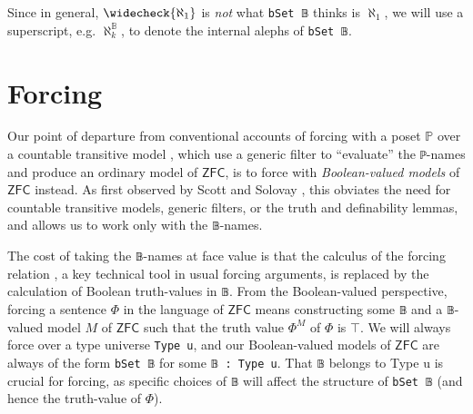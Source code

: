 \documentclass[sigplan,10pt,review, autoref,anonymous]{acmart}
\newcommand{\lil}{\lstinline}
\newcommand{\ZFC}{\mathsf{ZFC}}
\theoremstyle{definition}
\begin{document}
Since in general, \(\widecheck{\aleph_1}\) is \emph{not} what \lil{bSet 𝔹} thinks is \(\aleph_1\), we will use a superscript, e.g. \(\aleph_k^{\mathbb{B}}\), to denote the internal alephs of \lil{bSet 𝔹}.




\section{Forcing} \label{section:forcing}
Our point of departure from conventional accounts of forcing with a poset \(\mathbb{P}\) over a countable transitive model \cite{kunen2014set, jech2013set}, which use a generic filter to ``evaluate'' the \lstinline{ℙ}-names and produce an ordinary model of \(\ZFC\), is to force with \emph{Boolean-valued models} of \(\ZFC\) instead. As first observed by Scott and Solovay \cite{scott-solovay}, this obviates the need for countable transitive models, generic filters, or the truth and definability lemmas, and allows us to work only with the \lstinline{𝔹}-names.

The cost of taking the \lstinline{𝔹}-names at face value is that the calculus of the forcing relation \cite{shoenfield1971unramified}, a key technical tool in usual forcing arguments, is replaced by the calculation of Boolean truth-values in \lstinline{𝔹}. From the Boolean-valued perspective, forcing a sentence \(\Phi\) in the language of \(\mathsf{ZFC}\) means constructing some \lil{𝔹} and a \lil{𝔹}-valued model \(M\) of \(\ZFC\) such that the truth value \(\Phi^{M}\) of \(\Phi\) is \(\top\). We will always force over a type universe \lil{Type u}, and our Boolean-valued models of \(\mathsf{ZFC}\) are always of the form \lil{bSet 𝔹} for some \lil{𝔹 : Type u}. That \lil{𝔹} belongs to {Type u} is crucial for forcing, as specific choices of \lil{𝔹} will affect the structure of \lil{bSet 𝔹} (and hence the truth-value of \(\Phi\)). %
\end{document}

